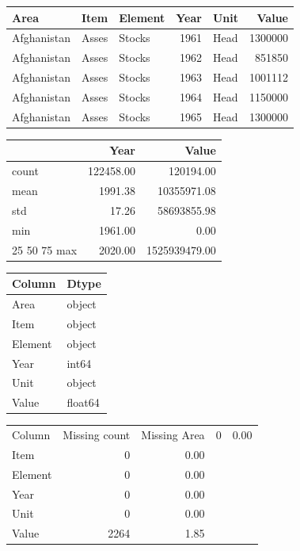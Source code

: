 \begin{tabular}{lllrlr}
\toprule
Area & Item & Element & Year & Unit & Value \\
\midrule
Afghanistan & Asses & Stocks & 1961 & Head & 1300000 \\
Afghanistan & Asses & Stocks & 1962 & Head & 851850 \\
Afghanistan & Asses & Stocks & 1963 & Head & 1001112 \\
Afghanistan & Asses & Stocks & 1964 & Head & 1150000 \\
Afghanistan & Asses & Stocks & 1965 & Head & 1300000 \\
\bottomrule
\end{tabular}

\begin{tabular}{lrr}
\toprule
 & Year & Value \\
\midrule
count & 122458.00 & 120194.00 \\
mean & 1991.38 & 10355971.08 \\
std & 17.26 & 58693855.98 \\
min & 1961.00 & 0.00 \\
25%
50%
75%
max & 2020.00 & 1525939479.00 \\
\bottomrule
\end{tabular}

\begin{tabular}{ll}
\toprule
Column & Dtype \\
\midrule
Area & object \\
Item & object \\
Element & object \\
Year & int64 \\
Unit & object \\
Value & float64 \\
\bottomrule
\end{tabular}

\begin{tabular}{lrr}
\toprule
Column & Missing count & Missing %
\midrule
Area & 0 & 0.00 \\
Item & 0 & 0.00 \\
Element & 0 & 0.00 \\
Year & 0 & 0.00 \\
Unit & 0 & 0.00 \\
Value & 2264 & 1.85 \\
\bottomrule
\end{tabular}

